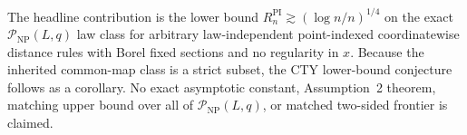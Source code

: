 The headline contribution is the lower bound \(R_n^{\mathrm{PI}}\gtrsim(\log n/n)^{1/4}\) on the exact \(\mathcal P_{\mathrm{NP}}(L,q)\) law class for arbitrary law-independent point-indexed coordinatewise distance rules with Borel fixed sections and no regularity in \(x\).  Because the inherited common-map class is a strict subset, the CTY lower-bound conjecture follows as a corollary.  No exact asymptotic constant, Assumption~2 theorem, matching upper bound over all of \(\mathcal P_{\mathrm{NP}}(L,q)\), or matched two-sided frontier is claimed.
